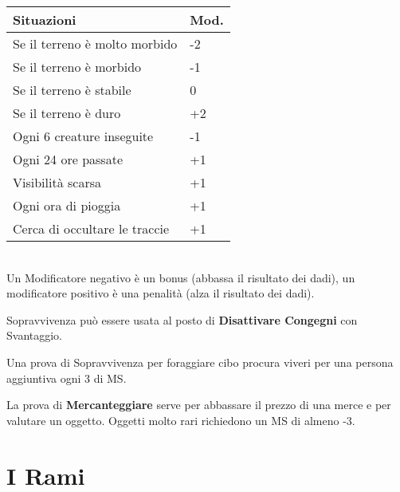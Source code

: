 \documentclass[12pt,a4paper,twoside,openany]{book}
\begin{document}
\begin{multicols}{2}
\begin{tabular}{ll}
	Situazioni & Mod.\\
	\toprule
	Se il terreno è molto morbido& -2\\
	Se il terreno è morbido& -1\\
	Se il terreno è stabile& 0\\
	Se il terreno è duro& +2\\
	Ogni 6 creature inseguite& -1\\
	Ogni 24 ore passate & +1\\
	Visibilità scarsa&+1\\
	Ogni ora di pioggia&+1 \\
	Cerca di occultare le traccie& +1\\
\end{tabular}\\

Un Modificatore negativo è un bonus (abbassa il risultato dei dadi), un modificatore positivo è una penalità (alza il risultato dei dadi).

Sopravvivenza può essere usata al posto di \textbf{Disattivare Congegni} con Svantaggio.

Una prova di Sopravvivenza per foraggiare cibo procura viveri per una persona aggiuntiva ogni 3 di MS.

\medskip

La prova di \textbf{Mercanteggiare} serve per abbassare il prezzo di una merce e per valutare un oggetto. Oggetti molto rari richiedono un MS di almeno -3.


\end{multicols}

\pagebreak


\section{I Rami}
\end{document}
